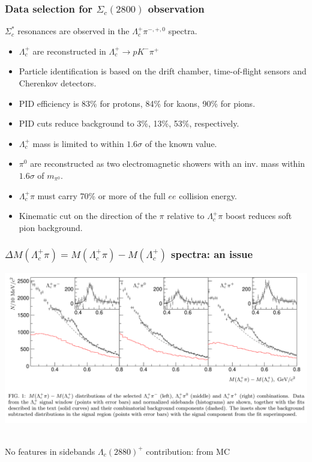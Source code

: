 \documentclass[10pt, aspectratio=169]{beamer}
\def\Lc{{\Lambda_c^+}}
\def\LcIII{{\Lambda_c(2880)^+}}
\def\ScIII{{\Sigma_c(2800)}}
\def\Scstar{{\Sigma_c^*}}
\def\pip{{\pi^+}}
\def\piz{{\pi^0}}
\def\Km{{K^-}}
\def\p{{p}}
\begin{document}
\begin{frame}[label=data-sc2800]%
  \frametitle{Data selection for $\ScIII$ observation}
  $\Scstar$ resonances are observed in the $\Lc\pi^{-,+,0}$ spectra.
  \begin{itemize}
    \item $\Lc$ are reconstructed in $\Lc\to\p\Km\pip$
    \item Particle identification is based on the drift chamber, 
      time-of-flight sensors and Cherenkov detectors.
    \item PID efficiency is 83\% for protons, 84\% for kaons,
      90\% for pions.
    \item PID cuts reduce background to 3\%, 13\%, 53\%, respectively.
    \item $\Lc$ mass is limited to within $1.6\sigma$
      of the known value.
    \item $\piz$ are reconstructed as two electromagnetic showers
      with an inv. mass within $1.6\sigma$ of $m_\piz$.
    \item $\Lc\pi$ must carry 70\% or more of the full
      $ee$ collision energy.
    \item Kinematic cut on the direction of the $\pi$ relative
      to $\Lc\pi$ boost reduces soft pion background.
  \end{itemize}
\end{frame}%

\begin{frame}[label=spectra-sc2800]%
  \frametitle{$\Delta M(\Lc\pi) = M(\Lc\pi) - M(\Lc)$ spectra: an issue}
  \centering
  \parbox{.8\linewidth}{
    \includegraphics[width=\linewidth]{figures/005/fig1-001}
  } \parbox{.19\linewidth}{
  }
  \\[2ex] \hfill
  No features in sidebands
  \hfill
  $\LcIII$ contribution: from MC
  \hfill \null
\end{frame}%
\end{document}
